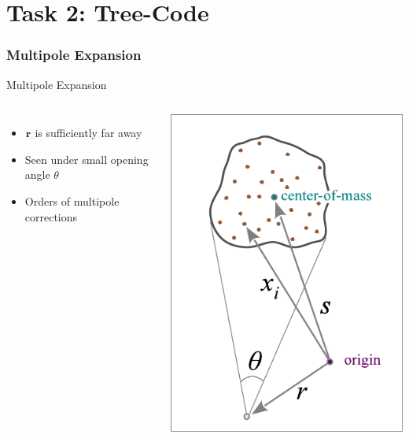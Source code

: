 \section{Task 2: Tree-Code}

\subsubsection{Multipole Expansion}
\begin{frame}{Multipole Expansion}
	\begin{columns}
		\begin{itemize}
			\item $\vb{r}$ is sufficiently far
			      away
			\item  Seen under small opening angle
			      $\theta$
			\item  Orders of multipole corrections
		\end{itemize}
		\includegraphics[width=\linewidth]{figures/multipole.png}
	\end{columns}
\end{frame}

